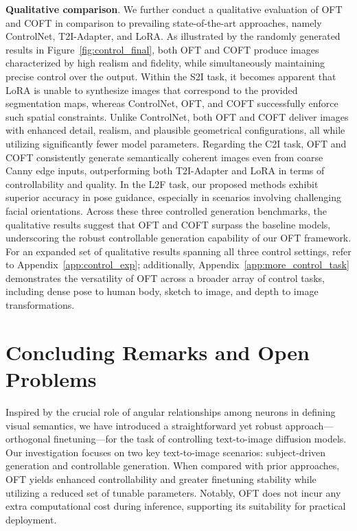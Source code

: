 \textbf{Qualitative comparison}. We further conduct a qualitative evaluation of OFT and COFT in comparison to prevailing state-of-the-art approaches, namely ControlNet, T2I-Adapter, and LoRA. As illustrated by the randomly generated results in Figure~\ref{fig:control_final}, both OFT and COFT produce images characterized by high realism and fidelity, while simultaneously maintaining precise control over the output. Within the S2I task, it becomes apparent that LoRA is unable to synthesize images that correspond to the provided segmentation maps, whereas ControlNet, OFT, and COFT successfully enforce such spatial constraints. Unlike ControlNet, both OFT and COFT deliver images with enhanced detail, realism, and plausible geometrical configurations, all while utilizing significantly fewer model parameters. Regarding the C2I task, OFT and COFT consistently generate semantically coherent images even from coarse Canny edge inputs, outperforming both T2I-Adapter and LoRA in terms of controllability and quality. In the L2F task, our proposed methods exhibit superior accuracy in pose guidance, especially in scenarios involving challenging facial orientations. Across these three controlled generation benchmarks, the qualitative results suggest that OFT and COFT surpass the baseline models, underscoring the robust controllable generation capability of our OFT framework. For an expanded set of qualitative results spanning all three control settings, refer to Appendix~\ref{app:control_exp}; additionally, Appendix~\ref{app:more_control_task} demonstrates the versatility of OFT across a broader array of control tasks, including dense pose to human body, sketch to image, and depth to image transformations.

\section{Concluding Remarks and Open Problems}

Inspired by the crucial role of angular relationships among neurons in defining visual semantics, we have introduced a straightforward yet robust approach—orthogonal finetuning—for the task of controlling text-to-image diffusion models. Our investigation focuses on two key text-to-image scenarios: subject-driven generation and controllable generation. When compared with prior approaches, OFT yields enhanced controllability and greater finetuning stability while utilizing a reduced set of tunable parameters. Notably, OFT does not incur any extra computational cost during inference, supporting its suitability for practical deployment.

